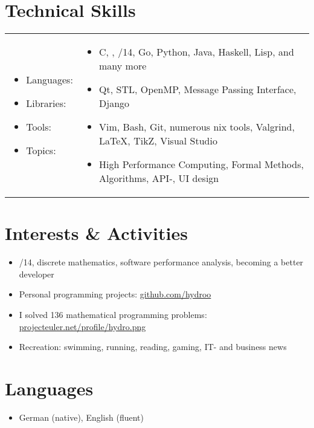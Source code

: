 \section*{Technical Skills}
\vspace{0.1cm} %
\begin{tabular}{l l}
	\begin{minipage}{0.18\textwidth}
		\begin{itemize}
			\item Languages:
			\item Libraries:
			\item Tools:
			\item Topics:
		\end{itemize}
	\end{minipage}
	&
	\begin{minipage}{0.80\textwidth}
		\begin{itemize}
			\item C, \cpp, \cpp11/14, Go, Python, Java, Haskell, Lisp, and many more
			\item Qt, STL, OpenMP, Message Passing Interface, Django
			\item Vim, Bash, Git, numerous \textasteriskcentered{}nix tools, Valgrind, \LaTeX, TikZ, Visual Studio
			\item High Performance Computing, Formal Methods, Algorithms, API-, UI design
		\end{itemize}
	\end{minipage}
\end{tabular}

\vspace{0.66cm} %

\pagebreak
\section*{Interests \& Activities}
\begin{itemize}
	\item {}/14, discrete mathematics, software performance analysis, becoming a better developer
	\item Personal programming projects: \href{https://github.com/hydroo}{github.com/hydroo}
	\item I solved 136 mathematical programming problems: \href{http://projecteuler.net/profile/hydro.png}{projecteuler.net/profile/hydro.png}
	\item Recreation: swimming, running, reading, gaming, IT- and business news
\end{itemize}

\customhrule
\section*{Languages}
\begin{itemize}
	\item German (native), English (fluent)
\end{itemize}


